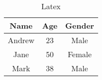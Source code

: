 \begin{table}
\centering
\begin{tabular}{|c|c|c|}
\hline
Name & Age & Gender \\
\hline
Andrew & 23 & Male \\
Jane & 50 & Female \\
Mark & 38 & Male \\
\hline
\end{tabular}
\caption{Latex}
\label{tab:latex_table}
\end{table}
